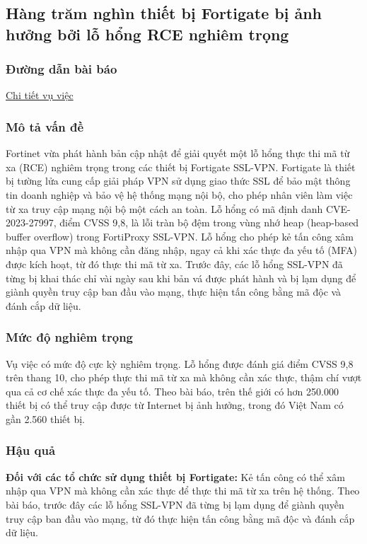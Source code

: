 \subsection{Hàng trăm nghìn thiết bị Fortigate bị ảnh hưởng bởi lỗ hổng RCE nghiêm trọng}

\subsubsection{Đường dẫn bài báo}
\href{https://mst.gov.vn/hang-tram-nghin-thiet-bi-fortigate-bi-anh-huong-boi-lo-hong-rce-nghiem-trong-197159209.htm}{Chi tiết vụ việc}

\subsubsection{Mô tả vấn đề}
Fortinet vừa phát hành bản cập nhật để giải quyết một lỗ hổng thực thi mã từ xa (RCE) nghiêm trọng trong các thiết bị Fortigate SSL-VPN. Fortigate là thiết bị tường lửa cung cấp giải pháp VPN sử dụng giao thức SSL để bảo mật thông tin doanh nghiệp và bảo vệ hệ thống mạng nội bộ, cho phép nhân viên làm việc từ xa truy cập mạng nội bộ một cách an toàn. Lỗ hổng có mã định danh CVE-2023-27997, điểm CVSS 9,8, là lỗi tràn bộ đệm trong vùng nhớ heap (heap-based buffer overflow) trong FortiProxy SSL-VPN. Lỗ hổng cho phép kẻ tấn công xâm nhập qua VPN mà không cần đăng nhập, ngay cả khi xác thực đa yếu tố (MFA) được kích hoạt, từ đó thực thi mã từ xa. Trước đây, các lỗ hổng SSL-VPN đã từng bị khai thác chỉ vài ngày sau khi bản vá được phát hành và bị lạm dụng để giành quyền truy cập ban đầu vào mạng, thực hiện tấn công bằng mã độc và đánh cắp dữ liệu.

\subsubsection{Mức độ nghiêm trọng}
Vụ việc có mức độ cực kỳ nghiêm trọng. Lỗ hổng được đánh giá điểm CVSS 9,8 trên thang 10, cho phép thực thi mã từ xa mà không cần xác thực, thậm chí vượt qua cả cơ chế xác thực đa yếu tố. Theo bài báo, trên thế giới có hơn 250.000 thiết bị có thể truy cập được từ Internet bị ảnh hưởng, trong đó Việt Nam có gần 2.560 thiết bị.

\subsubsection{Hậu quả}
\textbf{Đối với các tổ chức sử dụng thiết bị Fortigate:} Kẻ tấn công có thể xâm nhập qua VPN mà không cần xác thực để thực thi mã từ xa trên hệ thống. Theo bài báo, trước đây các lỗ hổng SSL-VPN đã từng bị lạm dụng để giành quyền truy cập ban đầu vào mạng, từ đó thực hiện tấn công bằng mã độc và đánh cắp dữ liệu.

